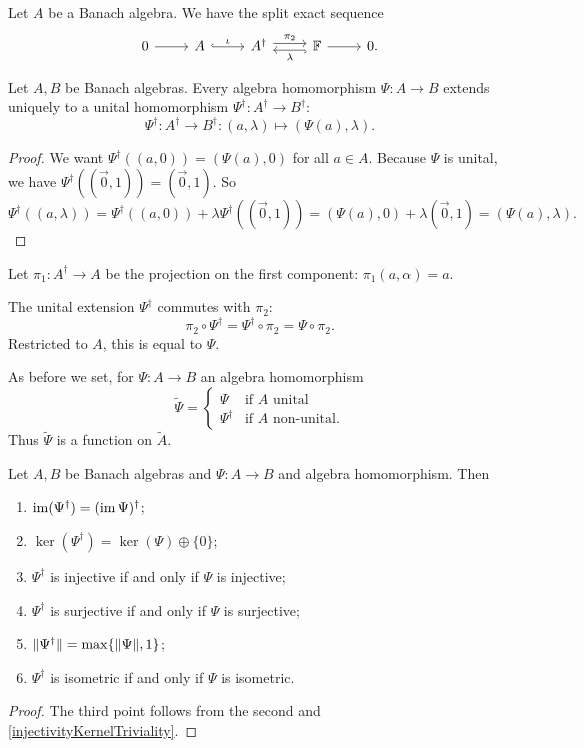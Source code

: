 \begin{lemma}
Let $A$ be a Banach algebra. We have the split exact sequence
\[ \begin{tikzcd}
0 \rar & A \rar[hook, "\iota"] & A^\dagger \rar[shift left, "\pi_2"] & \lar[hook, shift left, "\lambda"] \F \rar & 0.
\end{tikzcd} \]
\end{lemma}

\begin{lemma}
Let $A,B$ be Banach algebras. Every algebra homomorphism $\Psi:A\to B$ extends uniquely to a unital homomorphism $\Psi^\dagger: A^\dagger \to B^\dagger$:
\[ \Psi^\dagger: A^\dagger \to B^\dagger: (a,\lambda) \mapsto (\Psi(a),\lambda). \]
\end{lemma}
\begin{proof}
We want $\Psi^\dagger((a,0)) = (\Psi(a),0)$ for all $a\in A$. Because $\Psi$ is unital, we have $\Psi^\dagger((\vec{0},1)) = (\vec{0},1)$. So
\[ \Psi^\dagger((a,\lambda)) = \Psi^\dagger((a,0))+\lambda \Psi^\dagger((\vec{0},1)) = (\Psi(a),0) + \lambda(\vec{0},1) = (\Psi(a),\lambda). \]
\end{proof}
\begin{corollary} \label{projectionOnACommutes}
Let $\pi_1: A^\dagger \to A$ be the projection on the first component: $\pi_1(a,\alpha) = a$.

The unital extension $\Psi^\dagger$ commutes with $\pi_2$:
\[ \pi_2\circ\Psi^\dagger = \Psi^\dagger \circ \pi_2 = \Psi\circ \pi_2. \]
Restricted to $A$, this is equal to $\Psi$.
\end{corollary}

\begin{definition}
As before we set, for $\Psi: A \to B$ an algebra homomorphism
\[ \tilde{\Psi} = \begin{cases}
\Psi & \text{if $A$ unital} \\
\Psi^\dagger & \text{if $A$ non-unital.}
\end{cases} \]
Thus $\tilde{\Psi}$ is a function on $\tilde{A}$.
\end{definition}

\begin{lemma} \label{DaggerMorphismProperties}
Let $A,B$ be Banach algebras and $\Psi:A\to B$ and algebra homomorphism. Then
\begin{enumerate}
\item $\operatorname{im}(\Psi^\dagger) = (\operatorname{im}\Psi)^\dagger$;
\item $\ker(\Psi^\dagger) = \ker(\Psi)\oplus\{0\}$;
\item $\Psi^\dagger$ is injective \textup{if and only if} $\Psi$ is injective;
\item $\Psi^\dagger$ is surjective \textup{if and only if} $\Psi$ is surjective;
\item $\lVert\Psi^\dagger\rVert = \max\{\lVert\Psi\rVert,1\}$;
\item $\Psi^\dagger$ is isometric \textup{if and only if} $\Psi$ is isometric.
\end{enumerate}
\end{lemma}
\begin{proof}
The third point follows from the second and \ref{injectivityKernelTriviality}.
\end{proof}

